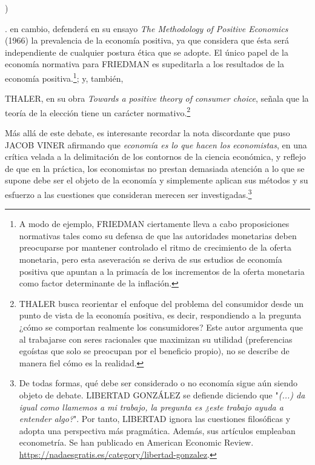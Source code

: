 \documentclass[10pt,a4paper]{article}
\newcounter{alphaitem}
\newcounter{numitem}
\newenvironment{la}
      {\begin{list}{\alph{alphaitem})}{%
          \usecounter{alphaitem}%
          \setlength{\leftmargin}{1cm}%
          \setlength{\parskip}{3pt}%
          \setlength{\itemsep}{0pt}%
          \setlength{\parsep}{0pt}%
      }}
      {\end{list}}
\newenvironment{lnum}
      {\begin{list}{\arabic{numitem}.}{%
          \usecounter{numitem}%
          \setlength{\leftmargin}{1cm}%
          \setlength{\parskip}{3pt}%
          \setlength{\itemsep}{0pt}%
          \setlength{\parsep}{0pt}%
      }}
      {\end{list}}
\begin{document}
\begin{la}
\begin{lnum}
{        } en cambio, defenderá en su ensayo \textit{The Methodology of Positive Economics} (1966) la prevalencia de la economía positiva, ya que considera que ésta será independiente de cualquier postura ética que se adopte. El único papel de la economía normativa para FRIEDMAN es supeditarla a los resultados de la economía positiva.\footnote{%
            A modo de ejemplo, FRIEDMAN ciertamente lleva a cabo proposiciones normativas tales como su defensa de que las autoridades monetarias deben preocuparse por mantener controlado el ritmo de crecimiento de la oferta monetaria, pero esta aseveración se deriva de sus estudios de economía positiva que apuntan a la primacía de los incrementos de la oferta monetaria como factor determinante de la inflación.
        }; y, también,
        \item THALER, en su obra \textit{Towards a positive theory of consumer choice}, señala que la teoría de la elección tiene un carácter normativo.\footnote{%
            THALER busca reorientar el enfoque del problema del consumidor desde un punto de vista de la economía positiva, es decir, respondiendo a la pregunta ¿cómo se comportan realmente los consumidores? Este autor argumenta que al trabajarse con seres racionales que maximizan su utilidad (preferencias egoístas que solo se preocupan por el beneficio propio), no se describe de manera fiel cómo es la realidad.
        }
    \end{lnum}
\end{la}

Más allá de este debate, es interesante recordar la nota discordante que puso JACOB VINER afirmando que \textit{economía es lo que hacen los economistas}, en una crítica velada a la delimitación de los contornos de la ciencia económica, y reflejo de que en la práctica, los economistas no prestan demasiada atención a lo que se supone debe ser el objeto de la economía y simplemente aplican sus métodos y su esfuerzo a las cuestiones que consideran merecen ser investigadas.\footnote{%
    De todas formas, qué debe ser considerado o no economía sigue aún siendo objeto de debate. LIBERTAD GONZÁLEZ se defiende diciendo que  "\textit{(...) da igual como llamemos a mi trabajo, la pregunta es ¿este trabajo ayuda a entender algo?}". Por tanto, LIBERTAD ignora las cuestiones filosóficas y adopta una perspectiva más pragmática. Además, sus artículos empleaban econometría. Se han publicado en American Economic Review. \href{https://nadaesgratis.es/category/libertad-gonzalez}{https://nadaesgratis.es/category/libertad-gonzalez}.
}
\end{document}
